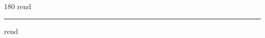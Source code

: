 
\begin{frame}
\begin{center}
\begin{turn}{180}
{\fontsize{2.5cm}{1em}\selectfont rend}
\end{turn}
\vspace{1em}\par  
\hrule
\vspace{1em}\par  
{\fontsize{2.5cm}{1em}\selectfont rend}
\end{center}
\end{frame}
